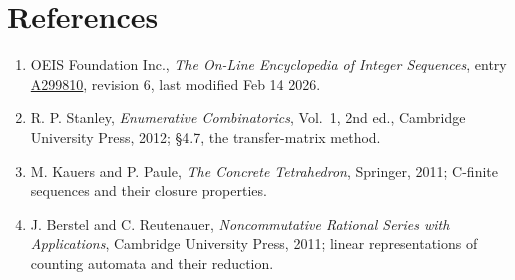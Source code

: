 \documentclass[11pt]{article}
\theoremstyle{definition}
\begin{document}
\section{References}

\begin{enumerate}

\item OEIS Foundation Inc., \emph{The On-Line Encyclopedia of Integer Sequences}, entry \href{https://oeis.org/A299810}{A299810}, revision 6, last modified Feb 14 2026.

\item R. P. Stanley, \emph{Enumerative Combinatorics}, Vol.~1, 2nd ed., Cambridge University Press, 2012; \S4.7, the transfer-matrix method.

\item M. Kauers and P. Paule, \emph{The Concrete Tetrahedron}, Springer, 2011; C-finite sequences and their closure properties.

\item J. Berstel and C. Reutenauer, \emph{Noncommutative Rational Series with Applications}, Cambridge University Press, 2011; linear representations of counting automata and their reduction.

\end{enumerate}
\end{document}
